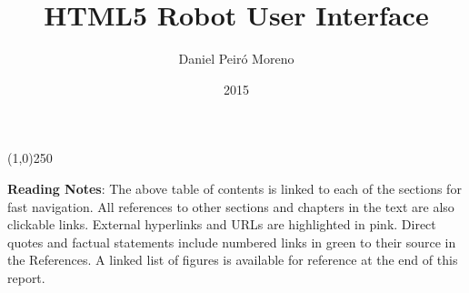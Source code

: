\documentclass[12pt,twoside,a4paper]{report}
\title{HTML5 Robot User Interface}
\author{Daniel Peiró Moreno}
\date{2015}
\begin{document}
\maketitle



\tableofcontents
\begin{center}
\line(1,0){250}
\end{center}
\textbf{Reading Notes}: The above table of contents is linked to each of the sections for fast navigation. All references
to other sections and chapters in the text are also clickable links. External hyperlinks and URLs are highlighted in pink. 
Direct quotes and factual statements include numbered links in green to their source in the References. A linked list of 
figures is available for reference at the end of this report.


















\listoffigures
\printindex
\end{document}
